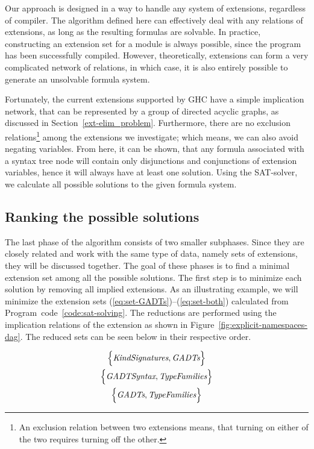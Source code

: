 \documentclass[main.tex]{subfiles}
\begin{document}
	Our approach is designed in a way to handle any system of extensions, regardless of compiler. The algorithm defined here can effectively deal with any relations of extensions, as long as the resulting formulas are solvable. In practice, constructing an extension set for a module is always possible, since the program has been successfully compiled. However, theoretically, extensions can form a very complicated network of relations, in which case, it is also entirely possible to generate an unsolvable formula system. %
	
	Fortunately, the current extensions supported by GHC have a simple implication network, that can be represented by a group of directed acyclic graphs, as discussed in Section~\ref{ext-elim_problem}. Furthermore, there are no exclusion relations\footnote{An exclusion relation between two extensions means, that turning on either of the two requires turning off the other.} among the extensions we investigate; which means, we can also avoid negating variables. From here, it can be shown, that any formula associated with a syntax tree node will contain only disjunctions and conjunctions of extension variables, hence it will always have at least one solution. Using the SAT-solver, we calculate all possible solutions to the given formula system.
	
	\subsection{Ranking the possible solutions} \label{ranking-solutions}
	
	The last phase of the algorithm consists of two smaller subphases. Since they are closely related and work with the same type of data, namely sets of extensions, they will be discussed together.	The goal of these phases is to find a minimal extension set among all the possible solutions. The first step is to minimize each solution by removing all implied extensions. As an illustrating example, we will minimize the extension sets (\ref{eq:set-GADTs})--(\ref{eq:set-both}) calculated from Program~code~\ref{code:sat-solving}. The reductions are performed using the implication relations of the extension as shown in Figure~\ref{fig:explicit-namespaces-dag}. The reduced sets can be seen below in their respective order.
	
	\begin{gather}
		\Big\{ \textit{KindSignatures}, \textit{GADTs} \Big\} \label{eq:reduced-set-GADTs} \\
		\Big\{ \textit{GADTSyntax}, \textit{TypeFamilies} \Big\} \label{eq:reduced-set-TypeFamilies} \\
		\Big\{ \textit{GADTs}, \textit{TypeFamilies} \Big\} \label{eq:reduced-set-both}
	\end{gather}
	
\end{document}
